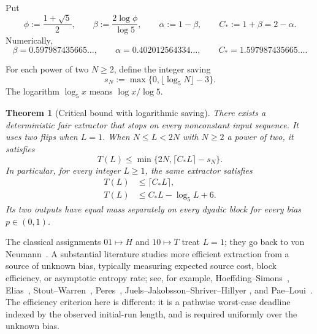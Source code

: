 \documentclass[11pt]{article}
\newtheorem{theorem}{Theorem}[section]
\theoremstyle{definition}
\theoremstyle{remark}
\begin{document}
Put
\begin{equation}\label{eq:constants}
 \phi:=\frac{1+\sqrt5}{2},
 \qquad
 \beta:=\frac{2\log\phi}{\log5},
 \qquad
 \alpha:=1-\beta,
 \qquad
 C_*:=1+\beta=2-\alpha.
\end{equation}
Numerically,
\[
 \beta=0.597987435665\ldots,
 \qquad
 \alpha=0.402012564334\ldots,
 \qquad
 C_*=1.597987435665\ldots.
\]

For each power of two $N\ge2$, define the integer saving
\begin{equation}\label{eq:shift}
 s_N:=\max\{0,\lfloor\log_5N\rfloor-3\}.
\end{equation}
The logarithm $\log_5 x$ means $\log x/\log5$.

\begin{theorem}[Critical bound with logarithmic saving]\label{thm:main}
There exists a deterministic fair extractor that stops on every nonconstant
input sequence. It uses two flips when $L=1$. When $N\le L<2N$ with $N\ge2$
a power of two, it satisfies
\begin{equation}\label{eq:main-profile}
 T(L)\le\min\{2N,\lceil C_*L\rceil-s_N\}.
\end{equation}
In particular, for every integer $L\ge1$, the same extractor satisfies
\begin{align}
 T(L)&\le\lceil C_*L\rceil,\label{eq:main-bound}\\
 T(L)&\le C_*L-\log_5L+6.\label{eq:main-log-bound}
\end{align}
Its two outputs have equal mass separately on every dyadic block for every
bias $p\in(0,1)$.
\end{theorem}

The classical assignments $01\mapsto H$ and $10\mapsto T$ treat $L=1$;
they go back to von Neumann~\cite{vonNeumann1951}. A substantial literature
studies more efficient extraction from a source of unknown bias, typically
measuring expected source cost, block efficiency, or asymptotic entropy rate;
see, for example, Hoeffding--Simons~\cite{HoeffdingSimons1970},
Elias~\cite{Elias1972}, Stout--Warren~\cite{StoutWarren1984},
Peres~\cite{Peres1992}, Juels--Jakobsson--Shriver--Hillyer
\cite{JuelsEtAl2000}, and Pae--Loui~\cite{PaeLoui2005}. The efficiency
criterion here is different: it is a pathwise worst-case deadline indexed by
the observed initial-run length, and is required uniformly over the unknown
bias.
\end{document}
